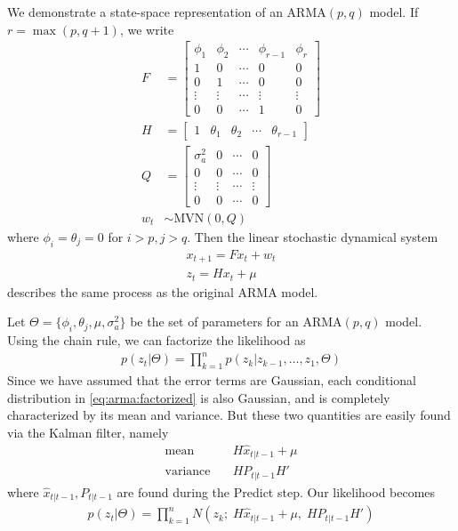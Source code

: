 We demonstrate a state-space representation of an $\text{ARMA}(p,q)$ model. If
$r = \max(p, q+1)$, we write
\begin{align}
    F &= \begin{bmatrix}
        \phi_1 & \phi_2 & \cdots & \phi_{r-1} & \phi_r\\
        1 & 0 & \cdots & 0 & 0\\
        0 & 1 & \cdots & 0 & 0\\
        \vdots & \vdots & \cdots & \vdots & \vdots\\
        0 & 0 & \cdots & 1 & 0
    \end{bmatrix}\\
    H &= \begin{bmatrix}
        1 & \theta_1 & \theta_2 & \cdots & \theta_{r-1}
    \end{bmatrix}\\
    Q &= \begin{bmatrix}
        \sigma_a^2 & 0 & \cdots & 0\\
        0 & 0 & \cdots & 0\\
        \vdots & \vdots & \cdots & \vdots\\
        0 & 0 & \cdots & 0
    \end{bmatrix}\\
    w_t &\sim \text{MVN}(0, Q)
\end{align}
where $\phi_i = \theta_j = 0$ for $i > p, j > q$. Then the linear stochastic
dynamical system 
\begin{align}
    x_{t+1} = Fx_t + w_t\\
    z_t = Hx_t + \mu
\end{align}
describes the same process as the original $\text{ARMA}$ model.

Let $\Theta = \{\phi_i, \theta_j, \mu, \sigma_a^2\}$ be the set of parameters
for an $\text{ARMA}(p,q)$ model. Using the chain rule, we can factorize the
likelihood as
\begin{align}
    \label{eq:arma:factorized}
    p(z_t | \Theta) = \prod_{k=1}^{n} p(z_k | z_{k-1}, \ldots, z_{1}, \Theta)
\end{align}
Since we have assumed that the error terms are Gaussian, each conditional
distribution in \ref{eq:arma:factorized} is also Gaussian, and is completely
characterized by its mean and variance. But these two quantities are easily
found via the Kalman filter, namely
\begin{align}
    \text{mean} & \quad H\hat{x}_{t|t-1} + \mu \\
    \text{variance} & \quad HP_{t|t-1}H'
\end{align}
where $\hat{x}_{t|t-1}, P_{t|t-1}$ are found during the Predict step. Our
likelihood becomes
\begin{align}
    \label{eq:arma:likelihood}
    p(z_t | \Theta) = \prod_{k=1}^{n} N(z_k;\; H\hat{x}_{t|t-1} + \mu,\;
    HP_{t|t-1}H')
\end{align}

